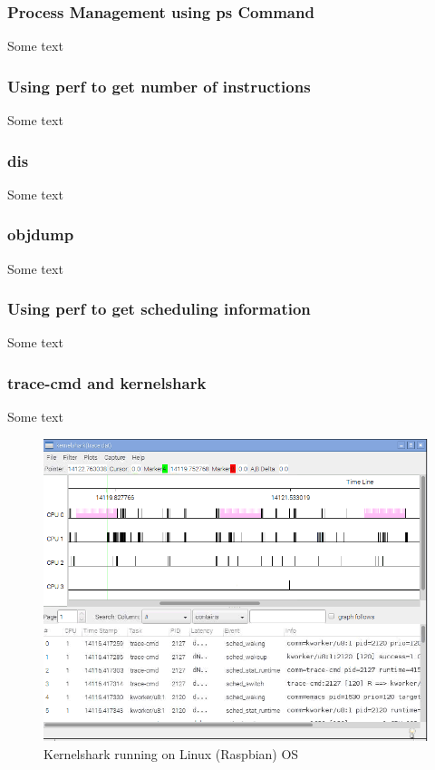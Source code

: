 \subsubsection{Process Management using ps Command} %
Some text \\
\subsubsection{Using perf to get number of instructions}
Some text \\
\subsubsection{dis}
Some text \\
\subsubsection{objdump}
Some text \\
\subsubsection{Using perf to get scheduling information}
Some text \\
\subsubsection{trace-cmd and kernelshark}
Some text \\
\begin{figure}[!ht]
	\includegraphics[scale=0.55]{content/images/kernelshark.png}
	\caption{Kernelshark running on Linux (Raspbian) OS}
	\label{fig:kernelshark}
\end{figure}

